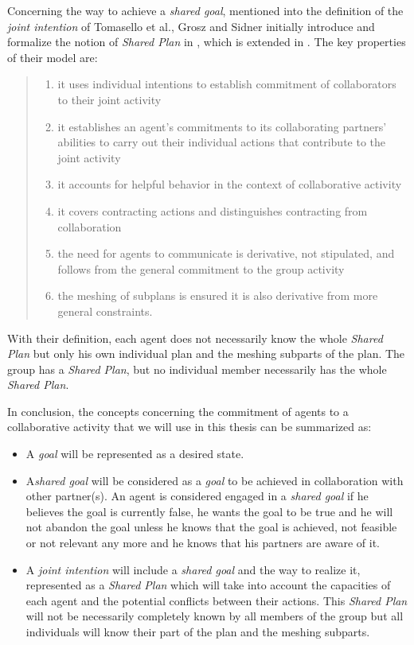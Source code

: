 \documentclass[english,a4paper,11pt,twoside]{StyleThese}
\begin{document}
Concerning the way to achieve a \textit{shared goal}, mentioned into the definition of the \textit{joint intention} of Tomasello et al., Grosz and Sidner initially introduce and formalize the notion of \textit{Shared Plan} in \cite{grosz1988plans}, which is extended in \cite{grosz1999evolution}. The key properties of their model are:
\begin{quote}
\begin{enumerate}
\item it uses individual intentions to establish commitment of collaborators to their joint activity
\item it establishes an agent's commitments to its collaborating partners' abilities to carry out their
individual actions that contribute to the joint activity
\item it accounts for helpful behavior in the context of collaborative activity
\item it covers contracting actions and distinguishes contracting from collaboration
\item the need for agents to communicate is derivative, not stipulated, and follows from the general
commitment to the group activity
\item the meshing of subplans is ensured it is also derivative from more general constraints.
\end{enumerate}
\end{quote}

With their definition, each agent does not necessarily know the whole \textit{Shared Plan} but only his own individual plan and the meshing subparts of the plan. The group has a \textit{Shared Plan}, but no individual member necessarily has the whole \textit{Shared Plan}.

In conclusion, the concepts concerning the commitment of agents to a collaborative activity that we will use in this thesis can be summarized as:
\begin{itemize}
\item A \textit{goal} will be represented as a desired state.
\item A\textit{shared goal} will be considered as a \textit{goal} to be achieved in collaboration with other partner(s). An agent is considered engaged in a \textit{shared goal} if he believes the goal is currently false, he wants the goal to be true and he will not abandon the goal unless he knows that the goal is achieved, not feasible or not relevant any more and he knows that his partners are aware of it.
\item A \textit{joint intention} will include a \textit{shared goal} and the way to realize it, represented as a \textit{Shared Plan} which will take into account the capacities of each agent and the potential conflicts between their actions. This \textit{Shared Plan} will not be necessarily completely known by all members of the group but all individuals will know their part of the plan and the meshing subparts.
\end{itemize}
\end{document}
